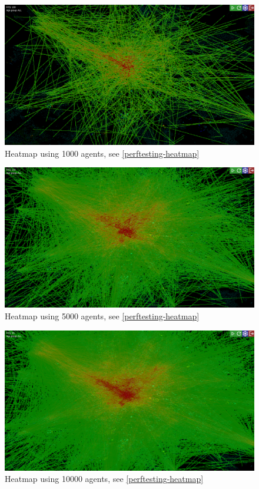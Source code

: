 \label{comparison_heatmap}
\begin{figure}[h]
    \centering
    \includegraphics[width=140mm, keepaspectratio]{images/heatmap_1000.png}
    \caption{Heatmap using 1000 agents, see \ref{perftesting-heatmap}}
\end{figure}
\begin{figure}[h]
    \centering
    \includegraphics[width=140mm, keepaspectratio]{images/heatmap_5000.png}
    \caption{Heatmap using 5000 agents, see \ref{perftesting-heatmap}}
\end{figure}
\begin{figure}[h]
    \centering
    \includegraphics[width=140mm, keepaspectratio]{images/heatmap_10000.png}
    \caption{Heatmap using 10000 agents, see \ref{perftesting-heatmap}}
\end{figure}
